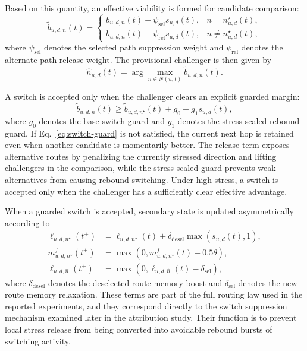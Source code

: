 \documentclass[5p,times]{elsarticle}
\begin{document}
Based on this quantity, an effective viability is formed for candidate comparison:
\begin{equation}\label{eq:effective-viability}
\tilde{b}_{u,d,n}(t)=
\begin{cases}
b_{u,d,n}(t)-\psi_{\mathrm{sel}} s_{u,d}(t), & n=n^\star_{u,d}(t),\\
b_{u,d,n}(t)+\psi_{\mathrm{rel}} s_{u,d}(t), & n\neq n^\star_{u,d}(t),
\end{cases}
\end{equation}
where $\psi_{\mathrm{sel}}$ denotes the selected path suppression weight and $\psi_{\mathrm{rel}}$ denotes the alternate path release weight. The provisional challenger is then given by
\begin{equation}
\hat{n}_{u,d}(t)=\arg\max_{n \in N(u,t)} \tilde{b}_{u,d,n}(t).
\end{equation}

A switch is accepted only when the challenger clears an explicit guarded margin:
\begin{equation}\label{eq:switch-guard}
\tilde{b}_{u,d,\hat{n}}(t)\ge \tilde{b}_{u,d,n^\star}(t)+g_0+g_1 s_{u,d}(t),
\end{equation}
where $g_0$ denotes the base switch guard and $g_1$ denotes the stress scaled rebound guard. If Eq.~\eqref{eq:switch-guard} is not satisfied, the current next hop is retained even when another candidate is momentarily better.
The release term exposes alternative routes by penalizing the currently stressed direction and lifting challengers in the comparison, while the stress-scaled guard prevents weak alternatives from causing rebound switching. Under high stress, a switch is accepted only when the challenger has a sufficiently clear effective advantage.

When a guarded switch is accepted, secondary state is updated asymmetrically according to
\begin{align}
\ell_{u,d,n^\star}(t^+) &= \ell_{u,d,n^\star}(t) + \delta_{\mathrm{desel}} \max(s_{u,d}(t), 1),\\
m^{f}_{u,d,n^\star}(t^+) &= \max\left(0, m^{f}_{u,d,n^\star}(t) - 0.5\theta\right),\\
\ell_{u,d,\hat{n}}(t^+) &= \max\left(0, \ell_{u,d,\hat{n}}(t) - \delta_{\mathrm{sel}}\right),
\end{align}
where $\delta_{\mathrm{desel}}$ denotes the deselected route memory boost and $\delta_{\mathrm{sel}}$ denotes the new route memory relaxation. These terms are part of the full routing law used in the reported experiments, and they correspond directly to the switch suppression mechanism examined later in the attribution study. Their function is to prevent local stress release from being converted into avoidable rebound bursts of switching activity.
\end{document}
